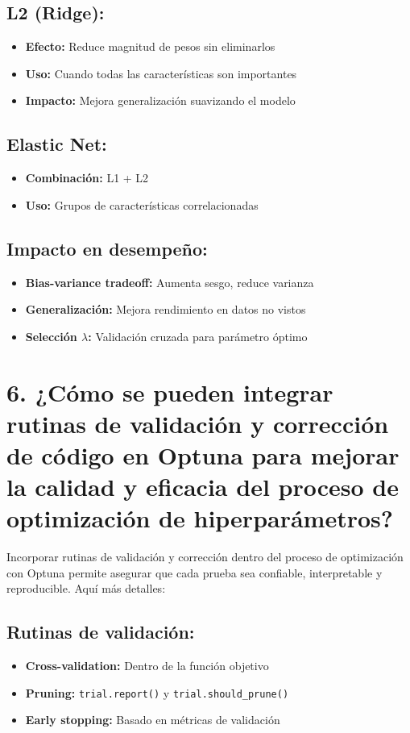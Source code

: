\documentclass[12pt,a4paper]{article}
\begin{document}
\subsection*{L2 (Ridge):}
\begin{itemize}[leftmargin=1.5cm]
    \item \textbf{Efecto:} Reduce magnitud de pesos sin eliminarlos
    \item \textbf{Uso:} Cuando todas las características son importantes
    \item \textbf{Impacto:} Mejora generalización suavizando el modelo
\end{itemize}

\subsection*{Elastic Net:}
\begin{itemize}[leftmargin=1.5cm]
    \item \textbf{Combinación:} L1 + L2
    \item \textbf{Uso:} Grupos de características correlacionadas
\end{itemize}

\subsection*{Impacto en desempeño:}
\begin{itemize}[leftmargin=1.5cm]
    \item \textbf{Bias-variance tradeoff:} Aumenta sesgo, reduce varianza
    \item \textbf{Generalización:} Mejora rendimiento en datos no vistos
    \item \textbf{Selección $\lambda$:} Validación cruzada para parámetro óptimo
\end{itemize}

\section*{6. ¿Cómo se pueden integrar rutinas de validación y corrección de código en Optuna para mejorar la calidad y eficacia del proceso de optimización de hiperparámetros?}

Incorporar rutinas de validación y corrección dentro del proceso de optimización con Optuna permite asegurar que cada prueba sea confiable, interpretable y reproducible. Aquí más detalles:

\subsection*{Rutinas de validación:}
\begin{itemize}[leftmargin=1.5cm]
    \item \textbf{Cross-validation:} Dentro de la función objetivo
    \item \textbf{Pruning:} \texttt{trial.report()} y \texttt{trial.should\_prune()}
    \item \textbf{Early stopping:} Basado en métricas de validación
\end{itemize}
\end{document}
